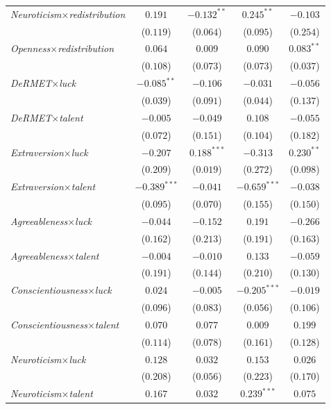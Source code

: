 \begin{footnotesize}
\begin{longtable}{l cc cc}
\textit{Neuroticism}$\times$\textit{redistribution} & $0.191$ & $-0.132^{**}$ & $0.245^{**}$ & $-0.103$ \\
    & ($0.119$) & ($0.064$) & ($0.095$) & ($0.254$) \\
\textit{Openness}$\times$\textit{redistribution} & $0.064$ & $0.009$ & $0.090$ & $0.083^{**}$ \\
    & ($0.108$) & ($0.073$) & ($0.073$) & ($0.037$) \\
\textit{DeRMET}$\times$\textit{luck} & $-0.085^{**}$ & $-0.106$ & $-0.031$ & $-0.056$ \\
    & ($0.039$) & ($0.091$) & ($0.044$) & ($0.137$) \\
\textit{DeRMET}$\times$\textit{talent} & $-0.005$ & $-0.049$ & $0.108$ & $-0.055$ \\
    & ($0.072$) & ($0.151$) & ($0.104$) & ($0.182$) \\
\textit{Extraversion}$\times$\textit{luck} & $-0.207$ & $0.188^{***}$ & $-0.313$ & $0.230^{**}$ \\
    & ($0.209$) & ($0.019$) & ($0.272$) & ($0.098$) \\
\textit{Extraversion}$\times$\textit{talent} & $-0.389^{***}$ & $-0.041$ & $-0.659^{***}$ & $-0.038$ \\
    & ($0.095$) & ($0.070$) & ($0.155$) & ($0.150$) \\
\textit{Agreeableness}$\times$\textit{luck} & $-0.044$ & $-0.152$ & $0.191$ & $-0.266$ \\
    & ($0.162$) & ($0.213$) & ($0.191$) & ($0.163$) \\
\textit{Agreeableness}$\times$\textit{talent} & $-0.004$ & $-0.010$ & $0.133$ & $-0.059$ \\
    & ($0.191$) & ($0.144$) & ($0.210$) & ($0.130$) \\
\textit{Conscientiousness}$\times$\textit{luck} & $0.024$ & $-0.005$ & $-0.205^{***}$ & $-0.019$ \\
    & ($0.096$) & ($0.083$) & ($0.056$) & ($0.106$) \\
\textit{Conscientiousness}$\times$\textit{talent} & $0.070$ & $0.077$ & $0.009$ & $0.199$ \\
    & ($0.114$) & ($0.078$) & ($0.161$) & ($0.128$) \\
\textit{Neuroticism}$\times$\textit{luck} & $0.128$ & $0.032$ & $0.153$ & $0.026$ \\
    & ($0.208$) & ($0.056$) & ($0.223$) & ($0.170$) \\
\textit{Neuroticism}$\times$\textit{talent} & $0.167$ & $0.032$ & $0.239^{***}$ & $0.075$ \\

\end{longtable}
\end{footnotesize}
